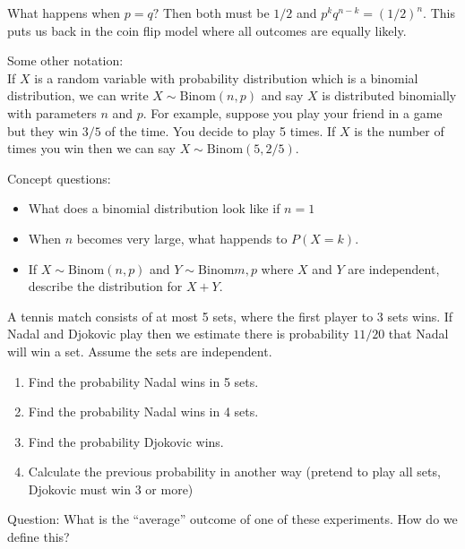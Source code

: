 \documentclass[14,fleqn]{article}
\begin{document}
What happens when $p=q?$ Then both must be $1/2$ and $p^kq^{n-k}=(1/2)^n.$ This puts us back in the coin flip model where all outcomes are equally likely. 

Some other notation:\\
If $X$ is a random variable with probability distribution which is a binomial distribution, we can write $X\sim \mathrm{Binom}(n,p)$ and say $X$ is distributed binomially with parameters $n$ and $p.$ For example, suppose you play your friend in a game but they win $3/5$ of the time. You decide to play 5 times. If $X$ is the number of times you win then we can say $X\sim \mathrm{Binom}(5,2/5).$
	
Concept questions:\\
\begin{itemize}
	\item What does a binomial distribution look like if $n=1$
	\item When $n$ becomes very large, what happends to $P(X=k).$
	\item If $X\sim \mathrm{Binom}(n,p)$ and $Y\sim \mathrm{Binom}{m,p}$ where $X$ and $Y$ are independent, describe the distribution for $X+Y.$
\end{itemize}

A tennis match consists of at most 5 sets, where the first player to 3 sets wins. If Nadal and Djokovic play then we estimate there is probability $11/20$ that Nadal will win a set. Assume the sets are independent.
\begin{enumerate}
	\item Find the probability Nadal wins in 5 sets.
	\item Find the probability Nadal wins in 4 sets.
	\item Find the probability Djokovic wins.
	\item Calculate the previous probability in another way (pretend to play all sets, Djokovic must win 3 or more)
\end{enumerate}

Question: What is the ``average'' outcome of one of these experiments. How do we define this?
\end{document}
